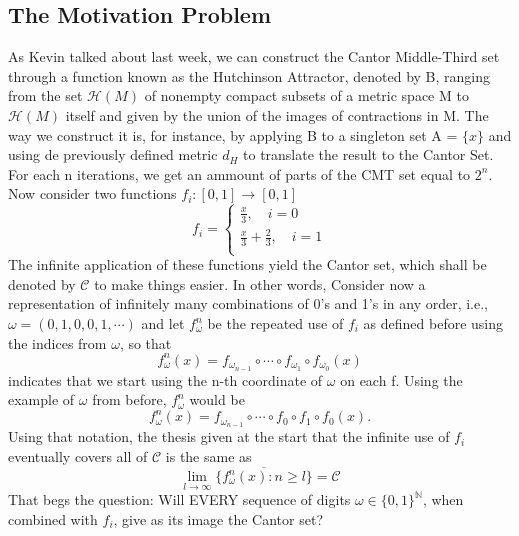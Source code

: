 \documentclass{article}
\begin{document}
\subsection{The Motivation Problem}
  As Kevin talked about last week, we can construct the Cantor Middle-Third set through a function known as the Hutchinson Attractor, denoted by B, ranging
from the set $\mathcal{H}(M)$ of nonempty compact subsets of a metric space M to $\mathcal{H}(M)$ itself and given by the union of the images of 
contractions in M. The way we construct it is, for instance, by applying B to a singleton set A = $\{x\}$ and using de previously defined metric $d_{H}$ to translate
the result to the Cantor Set. For each n iterations, we get an ammount of parts of the CMT set equal to $2^{n}.$ 
Now consider two functions $f_{i}:[0,1]\rightarrow [0, 1]$
  $$
    f_{i} = \left\{\begin{array}{ll}
        \frac{x}{3}, \quad i=0\\
        \frac{x}{3}+\frac{2}{3}, \quad i=1\\
      \end{array}\right.
  $$
  The infinite application of these functions yield the Cantor set, which shall be denoted by $\mathcal{C}$ to make things easier. In other words,
Consider now a representation of infinitely many combinations of 0's and 1's in any order, i.e., $\omega = (0, 1, 0, 0, 1, \cdots)$ and
let $f_{\omega}^{n}$ be the repeated use of $f_{i}$ as defined before using the indices from $\omega$, so that
  $$
  f_{\omega}^{n}(x) = f_{\omega_{n-1}}\circ{\cdots}\circ{f_{\omega_{1}}}\circ{f_{\omega_{0}}}(x)
  $$
  indicates that we start using the n-th coordinate of $\omega$ on each f. Using the example of $\omega$ from before, $f_{\omega}^{n}$
  would be
  $$
    f_{\omega}^{n}(x) = f_{\omega_{n-1}}\circ{\cdots}\circ{f_{0}}\circ{f_{1}}\circ{f_{0}}(x).
  $$
  Using that notation, the thesis given at the start that the infinite use of $f_{i}$ eventually covers all of $\mathcal{C}$ is the same as
  $$
  \lim_{l\to\infty}\overline{\{f_{\omega}^{n}(x):n\geq{l}\}} = \mathcal{C}
  $$
  That begs the question: Will EVERY sequence of digits $\omega\in\{0, 1\}^{\mathbb{N}}$, when combined with $f_{i}$, give 
as its image the Cantor set?
  
\end{document}
